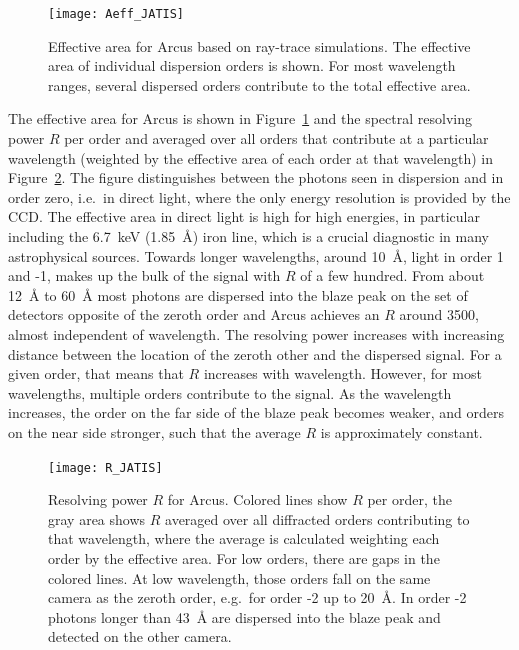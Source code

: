 \documentclass[12pt]{spieman}  %
\begin{document}
\begin{spacing}{1}
\begin{figure}
    \centering
    \texttt{[image: Aeff\_JATIS]}
    \caption {\label{fig:Aeff}
        Effective area for Arcus based on ray-trace simulations. The effective area of individual dispersion orders is shown. For most wavelength ranges, several dispersed orders contribute to the total effective area.
    }
\end{figure}

The effective area for Arcus is shown in Figure~\ref{fig:Aeff} and the spectral resolving power $R$ per order and averaged over all orders that contribute at a particular wavelength (weighted by the effective area of each order at that wavelength) in Figure~\ref{fig:R}. The figure distinguishes between the photons seen in dispersion and in order zero, i.e.\ in direct light, where the only energy resolution is provided by the CCD. The effective area in direct light is high for high energies, in particular including the 6.7~keV (1.85~\AA{}) iron line, which is a crucial diagnostic in many astrophysical sources. Towards longer wavelengths, around 10~\AA{}, light in order 1 and -1, makes up the bulk of the signal with $R$ of a few hundred. From about 12~\AA{} to 60~\AA{} most photons are dispersed into the blaze peak on the set of detectors opposite of the zeroth order and Arcus achieves an $R$ around 3500, almost independent of wavelength. The resolving power increases with increasing distance between the location of the zeroth other and the dispersed signal. For a given order, that means that $R$ increases with wavelength. However, for most wavelengths, multiple orders contribute to the signal. As the wavelength increases, the order on the far side of the blaze peak becomes weaker, and orders on the near side stronger, such that the average $R$ is approximately constant.


\begin{figure}
    \centering
    \texttt{[image: R\_JATIS]}

    \caption {\label{fig:R}
    Resolving power $R$ for Arcus. Colored lines show $R$ per order, the gray area shows $R$ averaged over all diffracted orders contributing to that wavelength, where the average is calculated weighting each order by the effective area. For low orders, there are gaps in the colored lines. At low wavelength, those orders fall on the same camera as the zeroth order, e.g.\ for order -2 up to 20~\AA{}. In order -2 photons longer than 43~\AA{} are dispersed into the blaze peak and detected on the other camera.
    }
\end{figure}


\end{spacing}
\end{document}
